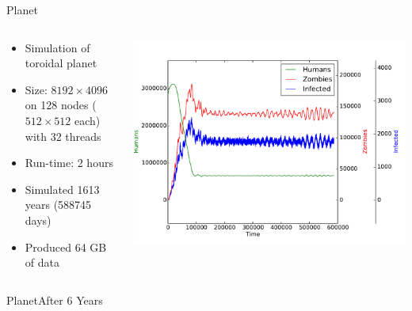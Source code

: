 \documentclass{beamer}
\begin{document}
\begin{frame}{Planet}
    \begin{columns}
        \begin{column}{0.4\textwidth}
            \begin{itemize}
                \item Simulation of toroidal planet
                \item Size: $8192 \times 4096$ on 128 nodes ($512 \times 512$ each) with 32 threads
                \item Run-time: 2 hours
                \item Simulated 1613 years (588745 days)
                \item Produced 64 GB of data
            \end{itemize}
        \end{column}
        \begin{column}{0.6\textwidth}
            \includegraphics[width=\textwidth]{torus/planet.pdf}
        \end{column}
    \end{columns}
\end{frame}

\begin{frame}{Planet}{After 6 Years}
    \begin{center}
    \end{center}
\end{frame}
\end{document}
